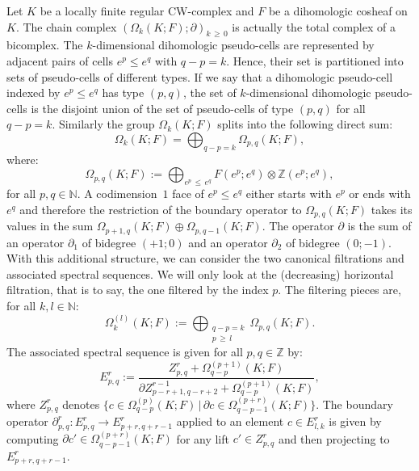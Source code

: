 \documentclass[10pt]{amsart}
\theoremstyle{definition}
\numberwithin{equation}{section}
\numberwithin{figure}{section}
\newcommand{\Z}{\mathbb{Z}}
\newcommand{\N}{\mathbb{N}}
\begin{document}
Let $K$ be a locally finite regular CW-complex and $F$ be a dihomologic cosheaf on~$K$. The chain complex $(\Omega_k(K;F);\partial)_{k\,\geq\,0}$ is actually the total complex of a bicomplex. The $k$-dimensional dihomologic pseudo-cells are represented by adjacent pairs of cells $e^p\leq e^q$ with $q-p=k$. Hence, their set is partitioned into sets of pseudo-cells of different types. If we say that a dihomologic pseudo-cell indexed by $e^p\leq e^q$ has type $(p,q)$, the set of $k$-dimensional dihomologic pseudo-cells is the disjoint union of the set of pseudo-cells of type $(p,q)$ for all $q-p=k$. Similarly the group $\Omega_k(K;F)$ splits into the following direct sum:
\begin{equation*}
\Omega_k(K;F)=\bigoplus_{q-p=k}\Omega_{p,q}(K;F),
\end{equation*}
where:
\begin{equation*}
\Omega_{p,q}(K;F):=\bigoplus_{e^p\,\leq \,e^q}F(e^p;e^q)\otimes\Z(e^p;e^q),
\end{equation*}
for all $p,q\in\N$. A codimension~$1$ face of $e^p\leq e^q$ either starts with $e^p$ or ends with $e^q$ and therefore the restriction of the boundary operator to $\Omega_{p,q}(K;F)$ takes its values in the sum $\Omega_{p+1,q}(K;F)\oplus\Omega_{p,q-1}(K;F)$. The operator $\partial$ is the sum of an operator $\partial_1$ of bidegree $(+1;0)$ and an operator $\partial_2$ of bidegree $(0;-1)$. With this additional structure, we can consider the two canonical filtrations and associated spectral sequences. We will only look at the (decreasing) horizontal filtration, that is to say, the one filtered by the index $p$. The filtering pieces are, for all $k,l\in\N$:
\begin{equation*}
\Omega_k^{(l)}(K;F):=\bigoplus_{\substack{q-p=k\\ p\,\geq\,l}}\Omega_{p,q}(K;F).
\end{equation*}
The associated spectral sequence is given for all $p,q\in\Z$ by:
\begin{equation*}
E^r_{p,q}:=\frac{Z^r_{p,q} + \Omega_{q-p}^{(p+1)}(K;F)}{\partial Z^{r-1}_{p-r+1,q-r+2}+\Omega_{q-p}^{(p+1)}(K;F)},
\end{equation*}
where $Z^r_{p,q}$ denotes $\{c\in \Omega_{q-p}^{(p)}(K;F) \,|\, \partial c \in \Omega_{q-p-1}^{(p+r)}(K;F) \}$. The boundary operator $\partial^r_{p,q}:E^r_{p,q}\rightarrow E^r_{p+r,q+r-1}$ applied to an element $c\in E^r_{l,k}$ is given by computing $\partial c'\in \Omega^{(p+r)}_{q-p-1}(K;F)$ for any lift $c'\in Z^r_{p,q}$ and then projecting to $E^r_{p+r,q+r-1}$.
\end{document}

